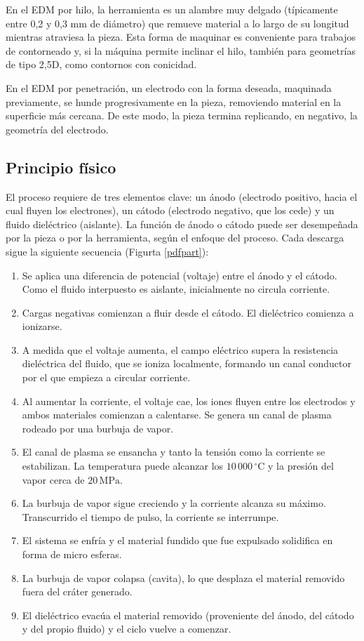 En el EDM por hilo, la herramienta es un alambre muy delgado (típicamente entre 0,2 y 0,3 mm de diámetro) que remueve material a lo largo de su longitud mientras atraviesa la pieza. Esta forma de maquinar es conveniente para trabajos de contorneado y, si la máquina permite inclinar el hilo, también para geometrías de tipo 2,5D, como contornos con conicidad.

En el EDM por penetración, un electrodo con la forma deseada, maquinada previamente, se hunde progresivamente en la pieza, removiendo material en la superficie más cercana. De este modo, la pieza termina replicando, en negativo, la geometría del electrodo.

\subsection{Principio físico}

El proceso requiere de tres elementos clave: un ánodo (electrodo positivo, hacia el cual fluyen los electrones), un cátodo (electrodo negativo, que los cede) y un fluido dieléctrico (aislante). La función de ánodo o cátodo puede ser desempeñada por la pieza o por la herramienta, según el enfoque del proceso. Cada descarga sigue la siguiente secuencia (Figurta \ref{pdfpart}):

\begin{enumerate}
	\item Se aplica una diferencia de potencial (voltaje) entre el ánodo y el cátodo. Como el fluido interpuesto es aislante, inicialmente no circula corriente.
	\item Cargas negativas comienzan a fluir desde el cátodo. El dieléctrico comienza a ionizarse.
	\item A medida que el voltaje aumenta, el campo eléctrico supera la resistencia dieléctrica del fluido, que se ioniza localmente, formando un canal conductor por el que empieza a circular corriente.
	\item Al aumentar la corriente, el voltaje cae, los iones fluyen entre los electrodos y ambos materiales comienzan a calentarse. Se genera un canal de plasma rodeado por una burbuja de vapor.
	\item El canal de plasma se ensancha y tanto la tensión como la corriente se estabilizan. La temperatura puede alcanzar los $10\,000\,^{\circ}\mathrm{C}$ y la presión del vapor cerca de $20\,\mathrm{MPa}$.
	\item La burbuja de vapor sigue creciendo y la corriente alcanza su máximo. Transcurrido el tiempo de pulso, la corriente se interrumpe.
	\item El sistema se enfría y el material fundido que fue expulsado solidifica en forma de micro esferas.
	\item La burbuja de vapor colapsa (cavita), lo que desplaza el material removido fuera del cráter generado.
	\item El dieléctrico evacúa el material removido (proveniente del ánodo, del cátodo y del propio fluido) y el ciclo vuelve a comenzar.
\end{enumerate}

